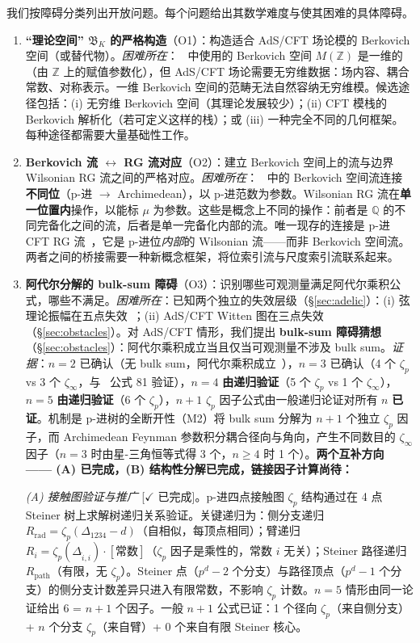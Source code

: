 \documentclass[11pt,a4paper]{ctexart}
\theoremstyle{remark}
\newcommand{\Q}{\mathbb{Q}}
\begin{document}
我们按障碍分类列出开放问题。每个问题给出其数学难度与使其困难的具体障碍。

\begin{enumerate}[leftmargin=2em]
    \item \textbf{``理论空间'' $\mathfrak{B}_K$ 的严格构造}（O1）：构造适合 AdS/CFT 场论模的 Berkovich 空间（或替代物）。\textit{困难所在}：~\cite{HMS20} 中使用的 Berkovich 空间 $M(\mathbb{Z})$ 是一维的（由 $\mathbb{Z}$ 上的赋值参数化），但 AdS/CFT 场论需要无穷维数据：场内容、耦合常数、对称表示。一维 Berkovich 空间的范畴无法自然容纳无穷维模。候选途径包括：(i) 无穷维 Berkovich 空间（其理论发展较少）；(ii) CFT 模栈的 Berkovich 解析化（若可定义这样的栈）；或 (iii) 一种完全不同的几何框架。每种途径都需要大量基础性工作。

    \item \textbf{Berkovich 流 $\leftrightarrow$ RG 流对应}（O2）：建立 Berkovich 空间上的流与边界 Wilsonian RG 流之间的严格对应。\textit{困难所在}：~\cite{HMS20} 中的 Berkovich 空间流连接\textbf{不同位}（p-进 $\to$ Archimedean），以 p-进范数为参数。Wilsonian RG 流在\textbf{单一位置内}操作，以能标 $\mu$ 为参数。这些是概念上不同的操作：前者是 $\Q$ 的不同完备化之间的流，后者是单一完备化内部的流。唯一现存的连接是 p-进 CFT RG 流~\cite{HLM19}，它是 p-进位\emph{内部}的 Wilsonian 流——而非 Berkovich 空间流。两者之间的桥接需要一种新概念框架，将位索引流与尺度索引流联系起来。

    \item \textbf{阿代尔分解的 bulk-sum 障碍}（O3）：识别哪些可观测量满足阿代尔乘积公式，哪些不满足。\textit{困难所在}：已知两个独立的失效层级（\S\ref{sec:adelic}）：(i) 弦理论振幅在五点失效~\cite{J22}；(ii) AdS/CFT Witten 图在三点失效（\S\ref{sec:obstacles}）。对 AdS/CFT 情形，我们提出 \textbf{bulk-sum 障碍猜想}（\S\ref{sec:obstacles}）：阿代尔乘积成立当且仅当可观测量不涉及 bulk sum。\textit{证据}：$n=2$ 已确认（无 bulk sum，阿代尔乘积成立~\cite{HSYZ20}），$n=3$ 已确认（4 个 $\zeta_p$ vs 3 个 $\zeta_\infty$，与~\cite{HJ24} 公式 81 验证），$n=4$ \textbf{由递归验证}（5 个 $\zeta_p$ vs 1 个 $\zeta_\infty$），$n=5$ \textbf{由递归验证}（6 个 $\zeta_p$），$n{+}1$ $\zeta_p$ 因子公式由一般递归论证对所有 $n$ \textbf{已证}。机制是 p-进树的全断开性（M2）将 bulk sum 分解为 $n{+}1$ 个独立 $\zeta_p$ 因子，而 Archimedean Feynman 参数积分耦合径向与角向，产生不同数目的 $\zeta_\infty$ 因子（$n=3$ 时由星-三角恒等式得 3 个，$n \geq 4$ 时 1 个）。\textbf{两个互补方向 —— (A) 已完成，(B) 结构性分解已完成，链接因子计算尚待：}

    \textit{(A) 接触图验证与推广} [$\checkmark$ 已完成]。p-进四点接触图 $\zeta_p$ 结构通过在 4 点 Steiner 树上求解树递归关系验证。关键递归为：侧分支递归 $R_{\text{rad}} = \zeta_p(\Delta_{1234}{-}d)$（自相似，每顶点相同）；臂递归 $R_i = \zeta_p(\Delta_{\hat{i},i}) \cdot [\text{常数}]$（$\zeta_p$ 因子是乘性的，常数 $i$ 无关）；Steiner 路径递归 $R_{\text{path}}$（有限，无 $\zeta_p$）。Steiner 点（$p^d{-}2$ 个分支）与路径顶点（$p^d{-}1$ 个分支）的侧分支计数差异只进入有限常数，不影响 $\zeta_p$ 计数。$n=5$ 情形由同一论证给出 6 = $n{+}1$ 个因子。一般 $n{+}1$ 公式已证：1 个径向 $\zeta_p$（来自侧分支）+ $n$ 个分支 $\zeta_p$（来自臂）+ 0 个来自有限 Steiner 核心。


\end{enumerate}
\end{document}
